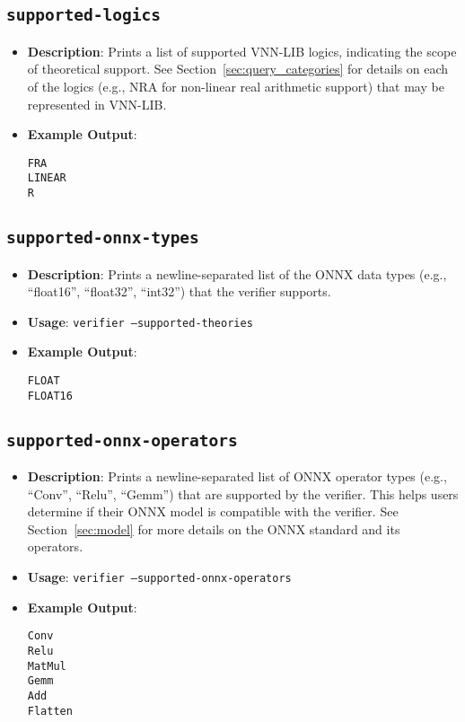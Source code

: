 \subsection{\texttt{supported-logics}}
\begin{itemize}
    \item \textbf{Description}: Prints a list of supported VNN-LIB logics, indicating the scope of theoretical support. See Section~\ref{sec:query_categories} for 
    details on each of the logics (e.g., NRA for non-linear real arithmetic support) that may be represented in VNN-LIB.
    \item \textbf{Example Output}:
    \begin{lstlisting}[style=bash, numbers=none, frame=none, backgroundcolor=\color{white}]
FRA
LINEAR
R
    \end{lstlisting}
\end{itemize}

\subsection{\texttt{supported-onnx-types}}
\begin{itemize}
    \item \textbf{Description}: Prints a newline-separated list of the ONNX data types (e.g., ``float16'', ``float32'', ``int32'') that the verifier supports.
    \item \textbf{Usage}: \texttt{verifier --supported-theories}
    \item \textbf{Example Output}:
    \begin{lstlisting}[style=bash, numbers=none, frame=none, backgroundcolor=\color{white}]
FLOAT
FLOAT16
    \end{lstlisting}
\end{itemize}

\subsection{\texttt{supported-onnx-operators}}
\begin{itemize}
    \item \textbf{Description}: Prints a newline-separated list of ONNX operator types (e.g., ``Conv'', ``Relu'', ``Gemm'') that are supported by the verifier. 
	This helps users determine if their ONNX model is compatible with the verifier. See Section~\ref{sec:model} for more details on the ONNX standard and its operators.
    \item \textbf{Usage}: \texttt{verifier --supported-onnx-operators}
    \item \textbf{Example Output}:
    \begin{lstlisting}[style=bash, numbers=none, frame=none, backgroundcolor=\color{white}]
Conv
Relu
MatMul
Gemm
Add
Flatten
    \end{lstlisting}
\end{itemize}

